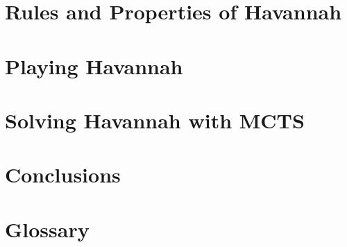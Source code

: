 \documentclass[12pt, letterpaper]{report}
\renewcommand{\baselinestretch}{1.33}
\numberwithin{equation}{section}
\begin{document}
  \chapter[Havannah]{\label{havannah} \LARGE Rules and Properties of Havannah}
  

  \chapter[Playing Havannah]{\label{playing} \LARGE Playing Havannah }
  

  \chapter[Solving Havannah with MCTS]{\label{solving} \LARGE Solving Havannah with MCTS}
  

  \chapter[Conclusions]{\label{conclusion} \LARGE Conclusions}
  

  \appendix

  \chapter[Glossary]{\label{glossary} \LARGE Glossary}
  


  \small
  \renewcommand{\baselinestretch}{0.25}
  
\end{document}
